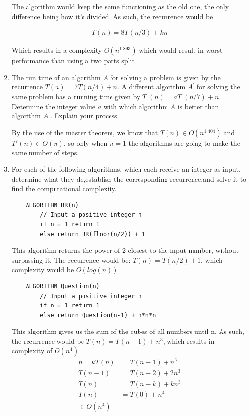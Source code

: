 \documentclass{article}
\begin{document}
\begin{enumerate}
    The algorithm would keep the same functioning as the old one, the only difference being how it's divided. As such, the recurrence would be

    \begin{align*}
        T(n) = 8T(n/3) + kn
    \end{align*}

    Which results in a complexity $O(n^{1.893})$ which would result in worst performance than using a two parts split

    \item The run time of an algorithm $A$ for solving a problem is given by the recurrence $T(n) = 7T(n/4) + n.$ A different algorithm $A^{\prime}$ for solving the same problem has a running time given by $T^{\prime}(n) =aT^{\prime}(n/7) +n$. Determine  the  integer  value $a$ with  which  algorithm $A$ is  better  than  algorithm $A^{\prime}$.  Explain  your process.

    By the use of the master theorem, we know that $T(n) \in O(n^{1.404})$ and $T'(n) \in O(n)$, so only when $n = 1$ the algorithms are going to make the same number of steps.

    \item For each of the following algorithms, which each receive an integer as input, determine what they do,establish the corresponding recurrence,and solve it to find the computational complexity.
    \begin{lstlisting}
    ALGORITHM BR(n)
        // Input a positive integer n
        if n = 1 return 1
        else return BR(floor(n/2)) + 1
    \end{lstlisting}

    This algorithm returns the power of 2 closest to the input number, without surpassing it. The recurrence would be: $T(n) = T(n/2) + 1$, which complexity would be $O(log(n))$

    \begin{lstlisting}
    ALGORITHM Question(n)
        // Input a positive integer n
        if n = 1 return 1
        else return Question(n-1) + n*n*n
    \end{lstlisting}

    This algorithm gives us the sum of the cubes of all numbers until n. As such, the recurrence would be $T(n) = T(n - 1) + n^3$, which results in complexity of $O(n^4)$
    \begin{align*}
        n = k
        T(n) &= T(n - 1) + n^3\\
        T(n - 1 ) &= T(n - 2) + 2n^3\\
        T(n) &= T(n - k) + kn^3\\
        T(n) &= T(0) + n^4\\
        \in O(n^4)
    \end{align*}


\end{enumerate}
\end{document}
